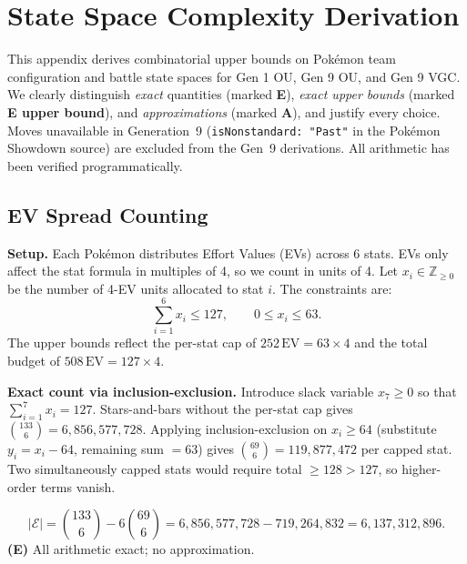 \section{State Space Complexity Derivation}
\label{sec:state-space-derivation}

This appendix derives combinatorial upper bounds on Pokémon team configuration and battle state spaces for Gen 1 OU, Gen 9 OU, and Gen 9 VGC.
We clearly distinguish \emph{exact} quantities (marked \textbf{E}), \emph{exact upper bounds} (marked \textbf{E upper bound}), and \emph{approximations} (marked \textbf{A}), and justify every choice.
Moves unavailable in Generation~9 (\texttt{isNonstandard:\ "Past"} in the Pok\'emon Showdown source) are excluded from the Gen~9 derivations.
All arithmetic has been verified programmatically.

\subsection{EV Spread Counting}
\label{sec:ev-derivation}

\textbf{Setup.}
Each Pokémon distributes Effort Values (EVs) across 6 stats.
EVs only affect the stat formula in multiples of 4, so we count in units of 4.
Let $x_i \in \mathbb{Z}_{\geq 0}$ be the number of 4-EV units allocated to stat $i$.
The constraints are:
\begin{equation}
    \sum_{i=1}^{6} x_i \leq 127, \qquad 0 \leq x_i \leq 63.
    \label{eq:ev-constraint}
\end{equation}
The upper bounds reflect the per-stat cap of $252\,\text{EV} = 63 \times 4$ and the total budget of $508\,\text{EV} = 127 \times 4$.

\textbf{Exact count via inclusion-exclusion.}
Introduce slack variable $x_7 \geq 0$ so that $\sum_{i=1}^{7} x_i = 127$.
Stars-and-bars without the per-stat cap gives $\binom{133}{6} = 6{,}856{,}577{,}728$.
Applying inclusion-exclusion on $x_i \geq 64$ (substitute $y_i = x_i - 64$, remaining sum $= 63$) gives $\binom{69}{6} = 119{,}877{,}472$ per capped stat.
Two simultaneously capped stats would require total $\geq 128 > 127$, so higher-order terms vanish.

\begin{equation}
    \boxed{|\mathcal{E}| = \binom{133}{6} - 6\binom{69}{6} = 6{,}856{,}577{,}728 - 719{,}264{,}832 = 6{,}137{,}312{,}896.}
    \label{eq:ev-exact}
\end{equation}
\textbf{(E)} All arithmetic exact; no approximation.

